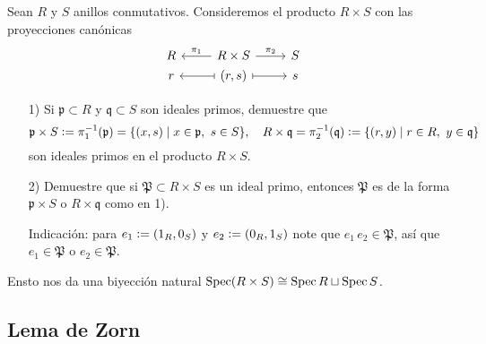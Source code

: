 \begin{ejercicio}
  Sean $R$ y $S$ anillos conmutativos. Consideremos el producto $R\times S$ con
  las proyecciones canónicas
  $$\begin{tikzcd}[row sep=0pt]
    R & R\times S\ar{l}[swap]{\pi_1}\ar{r}{\pi_2} & S \\
    r & (r,s) \ar[|->]{l}\ar[|->]{r} & s
  \end{tikzcd}$$

  \begin{enumerate}
  \item[1)] Si $\mathfrak{p} \subset R$ y $\mathfrak{q} \subset S$ son ideales
    primos, demuestre que
    \[ \mathfrak{p}\times S \mathrel{\mathop:}= \pi_1^{-1} (\mathfrak{p}) =
       \{ (x,s) \mid x \in \mathfrak{p}, ~ s\in S \}, \quad
       R\times \mathfrak{q} =
       \pi_2^{-1} (\mathfrak{q}) \mathrel{\mathop:}=
       \{ (r,y) \mid r\in R, ~ y\in \mathfrak{q} \} \]
    son ideales primos en el producto $R\times S$.

  \item[2)] Demuestre que si $\mathfrak{P} \subset R\times S$ es un ideal primo,
    entonces $\mathfrak{P}$ es de la forma $\mathfrak{p}\times S$ o
    $R\times \mathfrak{q}$ como en 1).

    Indicación: para $e_1 \mathrel{\mathop:}= (1_R,0_S)$ y $e_2 \mathrel{\mathop:}= (0_R,1_S)$ note que
    $e_1\,e_2 \in \mathfrak{P}$, así que $e_1 \in \mathfrak{P}$ o
    $e_2 \in \mathfrak{P}$.
  \end{enumerate}

  Ensto nos da una biyección natural
  $\operatorname{Spec} (R\times S) \cong \operatorname{Spec} R \sqcup \operatorname{Spec} S$.
\end{ejercicio}

\subsection*{Lema de Zorn}

